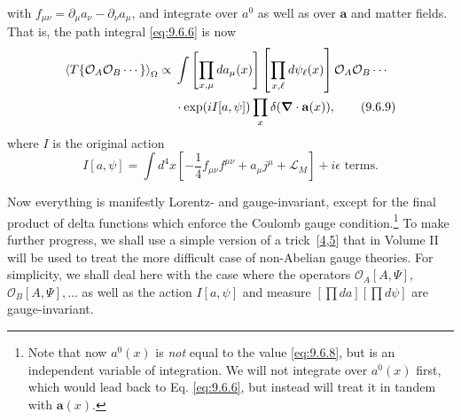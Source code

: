 with $f_{\mu\nu}=\partial_\mu a_\nu-\partial_\nu a_\mu$, and integrate over
$a^0$ as well as over $\mathbf a$ and matter fields. That is, the path
integral \eqref{eq:9.6.6} is now
\begin{align}
\left\langle T\{\mathcal O_A\mathcal O_B\cdots\}\right\rangle_{\Omega}
\propto{}&\int\left[\prod_{x,\mu}da_\mu(x)\right]
 \left[\prod_{x,\ell}d\psi_\ell(x)\right]
 \mathcal O_A\mathcal O_B\cdots
\notag\\
&\cdot\exp(iI[a,\psi])
 \prod_x\delta(\boldsymbol\nabla\cdot\mathbf a(x)),
\tag{9.6.9}\label{eq:9.6.9}
\end{align}
where $I$ is the original action
\begin{equation}
I[a,\psi]=\int d^4x\left[-\frac14f_{\mu\nu}f^{\mu\nu}
 +a_\mu j^\mu+\mathcal L_M\right]+i\epsilon\text{ terms}.
\tag{9.6.10}\label{eq:9.6.10}
\end{equation}

Now everything is manifestly Lorentz- and gauge-invariant, except for the
final product of delta functions which enforce the Coulomb gauge
condition.\footnote{Note that now $a^0(x)$ is \emph{not} equal to the value
\eqref{eq:9.6.8}, but is an independent variable of integration. We will not integrate
over $a^0(x)$ first, which would lead back to Eq. \eqref{eq:9.6.6}, but instead will
treat it in tandem with $\mathbf a(x)$.} To make further progress, we shall use
a simple version of a trick~[\hyperref[ref:9.4]{4},\hyperref[ref:9.5]{5}] that in Volume II will be used to treat the
more difficult case of non-Abelian gauge theories. For simplicity, we shall
deal here with the case where the operators $\mathcal O_A[A,\Psi]$,
$\mathcal O_B[A,\Psi],\ldots$ as well as the action $I[a,\psi]$ and measure
$[\prod da][\prod d\psi]$ are gauge-invariant.

